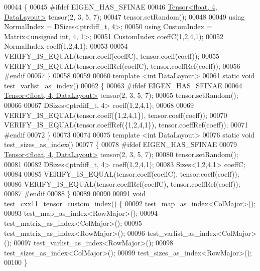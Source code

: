 \begin{DoxyCode}
00044 \{
00045 \textcolor{preprocessor}{#ifdef EIGEN\_HAS\_SFINAE}
00046   \hyperlink{class_eigen_1_1_tensor}{Tensor<float, 4, DataLayout>} tensor(2, 3, 5, 7);
00047   tensor.setRandom();
00048 
00049   \textcolor{keyword}{using} NormalIndex = DSizes<ptrdiff\_t, 4>;
00050   \textcolor{keyword}{using} CustomIndex = Matrix<unsigned int, 4, 1>;
00051   CustomIndex coeffC(1,2,4,1);
00052   NormalIndex coeff(1,2,4,1);
00053 
00054   VERIFY\_IS\_EQUAL(tensor.coeff(coeffC), tensor.coeff(coeff));
00055   VERIFY\_IS\_EQUAL(tensor.coeffRef(coeffC), tensor.coeffRef(coeff));
00056 \textcolor{preprocessor}{#endif}
00057 \}
00058 
00059 
00060 \textcolor{keyword}{template} <\textcolor{keywordtype}{int} DataLayout>
00061 \textcolor{keyword}{static} \textcolor{keywordtype}{void} test\_varlist\_as\_index()
00062 \{
00063 \textcolor{preprocessor}{#ifdef EIGEN\_HAS\_SFINAE}
00064   \hyperlink{class_eigen_1_1_tensor}{Tensor<float, 4, DataLayout>} tensor(2, 3, 5, 7);
00065   tensor.setRandom();
00066 
00067   DSizes<ptrdiff\_t, 4> coeff(1,2,4,1);
00068 
00069   VERIFY\_IS\_EQUAL(tensor.coeff(\{1,2,4,1\}), tensor.coeff(coeff));
00070   VERIFY\_IS\_EQUAL(tensor.coeffRef(\{1,2,4,1\}), tensor.coeffRef(coeff));
00071 \textcolor{preprocessor}{#endif}
00072 \}
00073 
00074 
00075 \textcolor{keyword}{template} <\textcolor{keywordtype}{int} DataLayout>
00076 \textcolor{keyword}{static} \textcolor{keywordtype}{void} test\_sizes\_as\_index()
00077 \{
00078 \textcolor{preprocessor}{#ifdef EIGEN\_HAS\_SFINAE}
00079   \hyperlink{class_eigen_1_1_tensor}{Tensor<float, 4, DataLayout>} tensor(2, 3, 5, 7);
00080   tensor.setRandom();
00081 
00082   DSizes<ptrdiff\_t, 4> coeff(1,2,4,1);
00083   Sizes<1,2,4,1> coeffC;
00084 
00085   VERIFY\_IS\_EQUAL(tensor.coeff(coeffC), tensor.coeff(coeff));
00086   VERIFY\_IS\_EQUAL(tensor.coeffRef(coeffC), tensor.coeffRef(coeff));
00087 \textcolor{preprocessor}{#endif}
00088 \}
00089 
00090 
00091 \textcolor{keywordtype}{void} test\_cxx11\_tensor\_custom\_index() \{
00092   test\_map\_as\_index<ColMajor>();
00093   test\_map\_as\_index<RowMajor>();
00094   test\_matrix\_as\_index<ColMajor>();
00095   test\_matrix\_as\_index<RowMajor>();
00096   test\_varlist\_as\_index<ColMajor>();
00097   test\_varlist\_as\_index<RowMajor>();
00098   test\_sizes\_as\_index<ColMajor>();
00099   test\_sizes\_as\_index<RowMajor>();
00100 \}
\end{DoxyCode}
